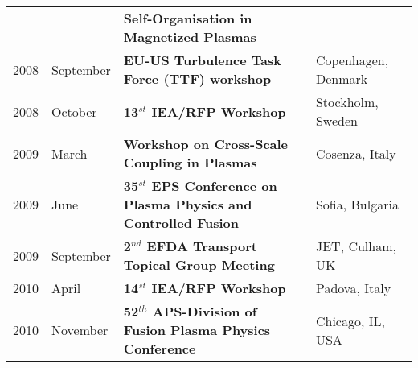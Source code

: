 \begin{longtable}{llll}
& & \textbf{Self-Organisation in Magnetized Plasmas} & \\
2008 & September & \textbf{EU-US Turbulence Task Force (TTF) workshop}
& Copenhagen, Denmark \\
2008 & October & \textbf{13$^{st}$ IEA/RFP Workshop} & Stockholm,
Sweden \\
2009 & March & \textbf{Workshop on Cross-Scale Coupling in Plasmas} &
Cosenza, Italy  \\
2009 & June & \textbf{35$^{st}$ EPS Conference on Plasma Physics and
  Controlled Fusion} & Sofia, Bulgaria \\
2009 & September & \textbf{2$^{nd}$ EFDA Transport Topical Group
  Meeting} & JET, Culham, UK \\
2010 & April & \textbf{14$^{st}$ IEA/RFP Workshop} & Padova, Italy \\
2010 & November & \textbf{52$^{th}$ APS-Division of Fusion Plasma
  Physics Conference} & Chicago, IL, USA \\
\end{longtable}

